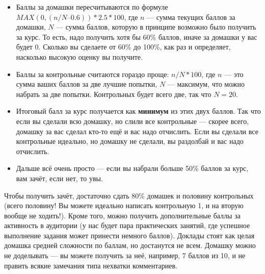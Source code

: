 \documentclass{../../text-style}
\begin{document}
\begin{itemize}
    \item Баллы за домашки пересчитываются по формуле $MAX(0, (n/N – 0.6)) * 2.5 * 100$, где $n$ --- сумма текущих баллов за домашки, $N$ --- сумма баллов, которую в принципе возможно было получить за курс. То есть, надо получить хотя бы 60\% баллов, иначе за домашки у вас будет 0. Сколько вы сделаете от 60\% до 100\%, как раз и определяет, насколько высокую оценку вы получите.
    \item Баллы за контрольные считаются гораздо проще: $n/N * 100$, где $n$ --- это сумма ваших баллов за две лучшие попытки, $N$ --- максимум, что можно набрать за две попытки. Контрольных будет всего две, так что $N = 20$.
    \item Итоговый балл за курс получается как \textbf{минимум} из этих двух баллов. Так что если вы сделали всю домашку, но слили все контрольные --- скорее всего, домашку за вас сделал кто-то ещё и вас надо отчислить. Если вы сделали все контрольные идеально, но домашку не сделали, вы раздолбай и вас надо отчислить.
    \item Дальше всё очень просто --- если вы набрали больше 50\% баллов за курс, вам зачёт, если нет, то увы.
\end{itemize}

Чтобы получить зачёт, достаточно сдать 80\% домашек и половину контрольных (всего половину! Вы можете идеально написать контрольную 1, и на вторую вообще не ходить!). Кроме того, можно получить дополнительные баллы за активность в аудитории (у нас будет пара практических занятий, где успешное выполнение задания может принести немного баллов). Доклады стоят как целая домашка средней сложности по баллам, но достанутся не всем. Домашку можно не доделывать --- вы можете получить за неё, например, 7 баллов из 10, и не править всякие замечания типа нехватки комментариев.
\end{document}
